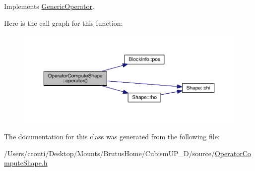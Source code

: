 Implements \hyperlink{class_generic_operator_aacd69e70a1e2d75b97358fca48689a67}{Generic\+Operator}.



Here is the call graph for this function\+:\nopagebreak
\begin{figure}[H]
\begin{center}
\leavevmode
\includegraphics[width=350pt]{d1/dd9/class_operator_compute_shape_ad9d3edd854162a93b5c7212bd694e73a_cgraph}
\end{center}
\end{figure}




The documentation for this class was generated from the following file\+:\begin{DoxyCompactItemize}
\item 
/\+Users/cconti/\+Desktop/\+Mounts/\+Brutus\+Home/\+Cubism\+U\+P\+\_\+D/source/\hyperlink{_operator_compute_shape_8h}{Operator\+Compute\+Shape.\+h}\end{DoxyCompactItemize}
